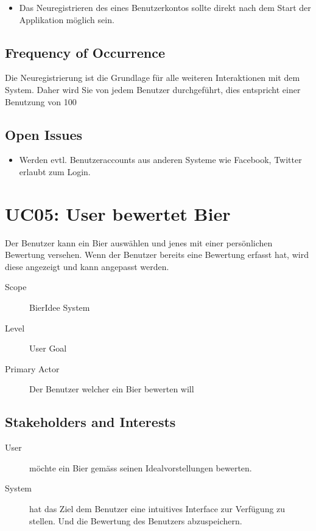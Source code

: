 \documentclass[10pt,a4paper]{scrartcl}
\begin{document}
\begin{itemize}
\item Das Neuregistrieren des eines Benutzerkontos sollte direkt nach dem Start der Applikation möglich sein. 
\end{itemize}



\subsection*{Frequency of Occurrence}

Die Neuregistrierung ist die Grundlage für alle weiteren Interaktionen mit dem System. Daher wird Sie von jedem Benutzer durchgeführt, dies entspricht einer Benutzung von 100%


\subsection*{Open Issues}

\begin{itemize}
\item Werden evtl. Benutzeraccounts aus anderen Systeme wie Facebook, Twitter erlaubt zum Login.
\end{itemize}


\section*{UC05: User bewertet Bier}
Der Benutzer kann ein Bier auswählen und jenes mit einer persönlichen Bewertung versehen. Wenn der Benutzer bereits eine Bewertung erfasst hat, wird diese angezeigt und kann angepasst werden.

\begin{description}
\item[Scope] BierIdee System
\item[Level] User Goal
\item[Primary Actor] Der Benutzer welcher ein Bier bewerten will
\end{description}


\subsection*{Stakeholders and Interests}

\begin{description}
\item[User] möchte ein Bier gemäss seinen Idealvorstellungen bewerten.
\item[System] hat das Ziel dem Benutzer eine intuitives Interface zur Verfügung zu stellen. Und die Bewertung des Benutzers abzuspeichern.
\end{description}
\end{document}
